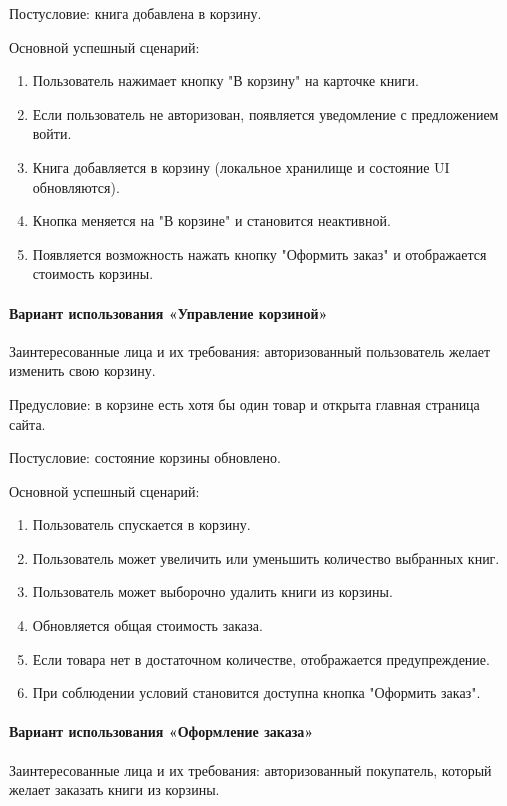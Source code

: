 Постусловие: книга добавлена в корзину.

Основной успешный сценарий:

\begin{enumerate}
	\item Пользователь нажимает кнопку "В корзину" на карточке книги.
	\item Если пользователь не авторизован, появляется уведомление с предложением войти.
	\item Книга добавляется в корзину (локальное хранилище и состояние UI обновляются).
	\item Кнопка меняется на "В корзине" и становится неактивной.
	\item Появляется возможность нажать кнопку "Оформить заказ"
	и отображается стоимость корзины.
\end{enumerate}

\paragraph{Вариант использования «Управление корзиной»}

Заинтересованные лица и их требования: авторизованный пользователь желает изменить свою корзину.

Предусловие: в корзине есть хотя бы один товар и открыта главная страница сайта.

Постусловие: состояние корзины обновлено.

Основной успешный сценарий:

\begin{enumerate}
	\item Пользователь спускается в корзину.
	\item Пользователь может увеличить или уменьшить количество выбранных книг.
	\item Пользователь может выборочно удалить книги из корзины.
	\item Обновляется общая стоимость заказа.
	\item Если товара нет в достаточном количестве, отображается предупреждение.
	\item При соблюдении условий становится доступна кнопка "Оформить заказ".
\end{enumerate}


\paragraph{Вариант использования «Оформление заказа»}

Заинтересованные лица и их требования: авторизованный покупатель, который желает заказать книги из корзины.

